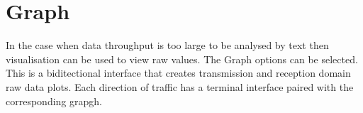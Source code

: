 \section{Graph}
 
In the case when data throughput is too large to be analysed by text then visualisation can be used to view raw values.
The \ds Graph options can be selected.
This is a biditectional interface that creates transmission and reception domain raw data plots.
Each direction of traffic has a terminal interface paired with the corresponding grapgh.
